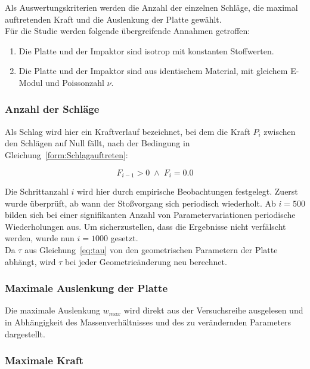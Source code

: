 Als Auswertungskriterien werden die Anzahl der einzelnen Schläge, die maximal auftretenden Kraft und die Auslenkung der Platte gewählt. \\
Für die Studie werden folgende übergreifende Annahmen getroffen: 

\begin{enumerate}
	\item{Die Platte und der Impaktor sind isotrop mit konstanten Stoffwerten.}
	\item{Die Platte und der Impaktor sind aus identischem Material, mit gleichem E-Modul und Poissonzahl $\nu$.}
\end{enumerate}

\newpage
\subsubsection*{Anzahl der Schläge}

Als Schlag wird hier ein Kraftverlauf bezeichnet, bei dem die Kraft $P_{i}$ zwischen den Schlägen auf Null fällt, nach der Bedingung in Gleichung~\ref{form:Schlagauftreten}:

\begin{equation} 
	\label{form:Schlagauftreten}
	F_{i-1} > 0 \; \wedge \; F_{i} = 0.0 
\end{equation}

Die Schrittanzahl $i$ wird hier durch empirische Beobachtungen festgelegt. Zuerst wurde überprüft, ab wann der Stoßvorgang sich periodisch wiederholt. Ab $i = 500$ bilden sich bei einer signifikanten Anzahl von Parametervariationen periodische Wiederholungen aus. Um sicherzustellen, dass die Ergebnisse nicht verfälscht werden, wurde nun $i = 1000$ gesetzt.\\
Da $\tau$ aus Gleichung~\ref{eq:tau} von den geometrischen Parametern der Platte abhängt, wird $\tau$ bei jeder Geometrieänderung neu berechnet.


\subsubsection*{Maximale Auslenkung der Platte}

Die maximale Auslenkung $w_{max}$ wird direkt aus der Versuchsreihe ausgelesen und in Abhängigkeit des Massenverhältnisses und des zu verändernden Parameters dargestellt.

\subsubsection*{Maximale Kraft}


